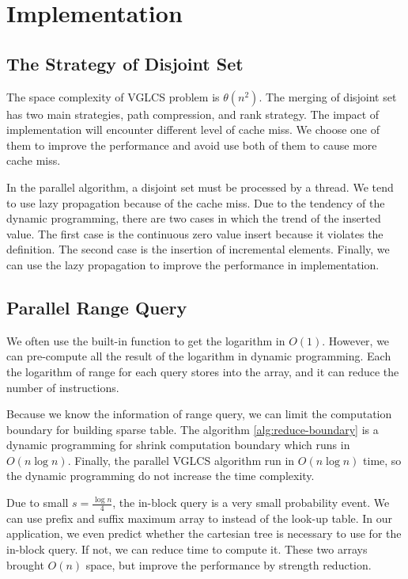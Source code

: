 \section{Implementation}
\label{sec:Implementation}

\subsection{The Strategy of Disjoint Set}

The space complexity of VGLCS problem is $\theta(n^2)$.  The merging
of disjoint set has two main strategies, path compression, and rank
strategy.  The impact of implementation will encounter different level
of cache miss.  We choose one of them to improve the performance and
avoid use both of them to cause more cache miss.

In the parallel algorithm, a disjoint set must be processed by a
thread.  We tend to use lazy propagation because of the cache miss.
Due to the tendency of the dynamic programming, there are two cases in
which the trend of the inserted value.  The first case is the
continuous zero value insert because it violates the definition.  The
second case is the insertion of incremental elements.  Finally, we can
use the lazy propagation to improve the performance in implementation.

\subsection{Parallel Range Query}

We often use the built-in function to get the logarithm in $O(1)$.
However, we can pre-compute all the result of the logarithm in dynamic
programming.  Each the logarithm of range for each query stores into
the array, and it can reduce the number of instructions.

Because we know the information of range query, we can limit the
computation boundary for building sparse table.  The algorithm
\ref{alg:reduce-boundary} is a dynamic programming for shrink
computation boundary which runs in $O(n \log n)$.  Finally, the
parallel VGLCS algorithm run in $O(n \log n)$ time, so the dynamic
programming do not increase the time complexity.



Due to small $s = \frac{\log n}{4}$, the in-block query is a very
small probability event.  We can use prefix and suffix maximum array
to instead of the look-up table.  In our application, we even predict
whether the cartesian tree is necessary to use for the in-block query.
If not, we can reduce time to compute it.  These two arrays brought
$O(n)$ space, but improve the performance by strength reduction.
